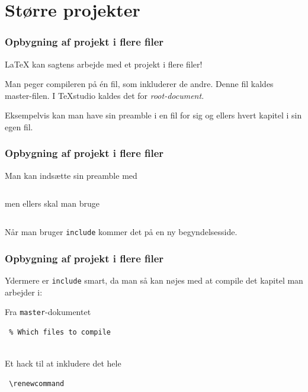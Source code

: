 \documentclass{beamer}
\begin{document}
\section{Større projekter}

\begin{frame}[fragile]
  \frametitle{Opbygning af projekt i flere filer}

  \LaTeX{} kan sagtens arbejde med et projekt i flere filer!

  Man peger compileren på \'{e}n fil, som inkluderer de andre. Denne fil kaldes
  \alert{master-filen}. I TeXstudio kaldes det for \emph{root-document}.

  Eksempelvis kan man have sin preamble i en fil for sig og ellers hvert kapitel
  i sin egen fil.
\end{frame}


\begin{frame}[fragile]
  \frametitle{Opbygning af projekt i flere filer}

    Man kan indsætte sin preamble med

\begin{verbatim}

\end{verbatim}

  men ellers skal man bruge

\begin{verbatim}

\end{verbatim}

  Når man bruger \texttt{include} kommer det på en ny begyndelsesside.
\end{frame}


\begin{frame}[fragile]
  \frametitle{Opbygning af projekt i flere filer}

  Ydermere er \texttt{include} smart, da man så kan nøjes med at compile det
  kapitel man arbejder i:

  \begin{exampleblock}{Fra \texttt{master}-dokumentet}
\begin{verbatim}
 % Which files to compile
 
\end{verbatim}
  \end{exampleblock}

    \begin{exampleblock}{Et hack til at inkludere det hele}
\begin{verbatim}
 \renewcommand
\end{verbatim}
  \end{exampleblock}
\end{frame}
\end{document}
